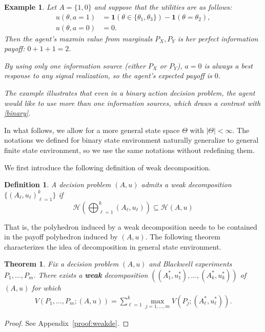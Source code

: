 \documentclass[11pt]{article}
\theoremstyle{plain}
\newtheorem{thm}{Theorem}
\newtheorem{defn}{Definition}
\newtheorem{ex}{Example}
\theoremstyle{remark}
\newcommand{\po}{\mathcal{H}}
\begin{document}
\begin{ex}
	Let $A = \{1, 0\}$ and suppose that the utilities are as follows:
	\begin{align*}
	u(\theta,a = 1) &= \mathbf{1}\left( \theta \in \{\theta_1, \theta_3\} \right) - \mathbf{1}\left( \theta = \theta_2\right), \\
	u(\theta,a = 0) &= 0.
	\end{align*}
Then the agent's maxmin value from marginals $P_X,P_Y$ is her perfect information payoff: $ 0+ 1+1=2$.
	
	By using only one information source (either $P_X$ or $P_Y$), $a=0$ is always a best response to any signal realization, so the agent's expected payoff is $0$. 
	
	The example illustrates that even in a binary action decision problem, the agent would like to use more than one information sources, which draws a contrast with \autoref{binary}.
\end{ex}

In what follows, we allow for a more general state space $\Theta$ with $|\Theta|<\infty$. The notations we defined for binary state environment naturally generalize to general finite state environment, so we use the same notations without redefining them.

We first introduce the following definition of weak decomposition.

\begin{defn}
A decision problem $(A,u)$ admits a weak decomposition $\{(A_\ell,u_\ell)_{\ell=1}^k\}$ if 
\[\po(\bigoplus_{\ell=1}^k(A_\ell,u_\ell))\subseteq \po(A,u)\]
\end{defn}
That is, the polyhedron induced by a weak decomposition needs to be contained in the payoff polyhedron induced by $(A,u)$. The following theorem characterizes the idea of decomposition in general state environment.

\begin{thm}\label{thm:weakde}
Fix a decision problem $(A,u)$ and Blackwell experiments $P_1, \ldots , P_m$.
There exists a \textbf{weak} decomposition $((A^*_1,u_1^*), \ldots , (A^*_k,u_k^*))$ of $(A,u)$ for which
\begin{align}
V(P_1, \ldots , P_m; (A,u)) = \sum_{\ell = 1}^{k} \max_{j = 1, \ldots, m} V(P_j; (A_\ell^*,u_\ell^*)). \label{eqn:optimaldecomp}
\end{align}

\end{thm}
\begin{proof}
See Appendix~\ref{proof:weakde}.
\end{proof}
\end{document}
